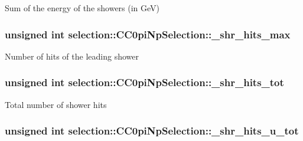 Sum of the energy of the showers (in Ge\-V) \hypertarget{classselection_1_1CC0piNpSelection_a750834ef52299d85f9596bbbafa1dffb}{
\subsubsection[{\-\_\-shr\-\_\-hits\-\_\-max}]{\setlength{\rightskip}{0pt plus 5cm}unsigned int selection\-::\-C\-C0pi\-Np\-Selection\-::\-\_\-shr\-\_\-hits\-\_\-max\hspace{0.3cm}{\ttfamily [private]}}}\label{classselection_1_1CC0piNpSelection_a750834ef52299d85f9596bbbafa1dffb}
Number of hits of the leading shower \hypertarget{classselection_1_1CC0piNpSelection_aa6e7162371e3e343df001f0afc8a20b8}{
\subsubsection[{\-\_\-shr\-\_\-hits\-\_\-tot}]{\setlength{\rightskip}{0pt plus 5cm}unsigned int selection\-::\-C\-C0pi\-Np\-Selection\-::\-\_\-shr\-\_\-hits\-\_\-tot\hspace{0.3cm}{\ttfamily [private]}}}\label{classselection_1_1CC0piNpSelection_aa6e7162371e3e343df001f0afc8a20b8}
Total number of shower hits \hypertarget{classselection_1_1CC0piNpSelection_afba4a31f84c2f125323b90f007bda1c6}{
\subsubsection[{\-\_\-shr\-\_\-hits\-\_\-u\-\_\-tot}]{\setlength{\rightskip}{0pt plus 5cm}unsigned int selection\-::\-C\-C0pi\-Np\-Selection\-::\-\_\-shr\-\_\-hits\-\_\-u\-\_\-tot\hspace{0.3cm}{\ttfamily [private]}}}\label{classselection_1_1CC0piNpSelection_afba4a31f84c2f125323b90f007bda1c6}
